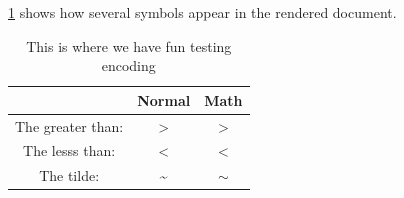\documentclass[letterpaper,12pt]{article}
\begin{document}
\label{app:encoding}
\ref{tab:encoding} shows how several symbols appear in the rendered document.

\begin{table}[H]
	\caption{\label{tab:encoding}This is where we have fun testing encoding}
	\begin{center}
		\begin{tabular}{|c|c|c|}
			\hline
			& Normal & Math \\
			\hline
			The greater than: & > & $>$ \\
			\hline
			The lesss than: & < & $<$ \\
			\hline
			The tilde: & \textasciitilde{} & $\sim$ \\
			\hline
		\end{tabular}
	\end{center}
\end{table}
\end{document}
